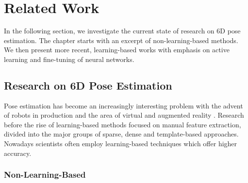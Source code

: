 \chapter{Related Work}

In the following section, we investigate the current state of research on 6D pose estimation. The chapter starts with an excerpt of non-learning-based methods. We then present more recent, learning-based works with emphasis on active learning and fine-tuning of neural networks.

\section{Research on 6D Pose Estimation}

Pose estimation has become an increasingly interesting problem with the advent of robots in production and the area of virtual and augmented reality \cite{bb8}. Research before the rise of learning-based methods focused on manual feature extraction, divided into the major groups of sparse, dense and template-based approaches. Nowadays scientists often employ learning-based techniques which offer higher accuracy.

\subsection{Non-Learning-Based}

